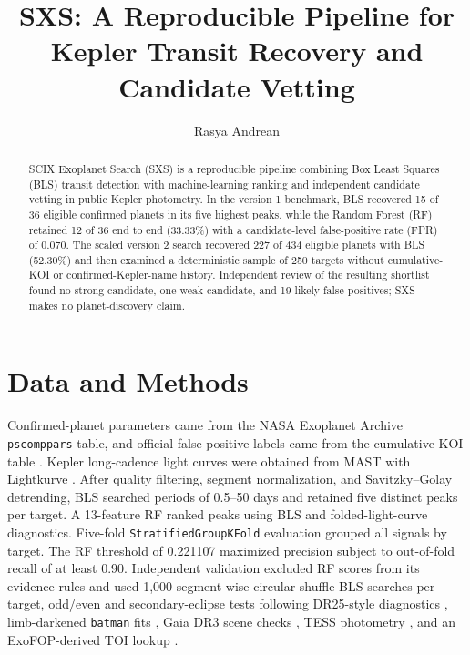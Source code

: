 \documentclass[RNAAS]{aastex7}
\begin{document}
\title{SXS: A Reproducible Pipeline for Kepler Transit Recovery and Candidate Vetting}
\author{Rasya Andrean}

\begin{abstract}
SCIX Exoplanet Search (SXS) is a reproducible pipeline combining Box Least
Squares (BLS) transit detection with machine-learning ranking and independent
candidate vetting in public Kepler photometry. In the version 1 benchmark, BLS
recovered 15 of 36 eligible confirmed planets in its five highest peaks, while
the Random Forest (RF) retained 12 of 36 end to end (33.33\%) with a
candidate-level false-positive rate (FPR) of 0.070. The scaled version 2 search
recovered 227 of 434 eligible planets with BLS (52.30\%) and then examined a
deterministic sample of 250 targets without cumulative-KOI or
confirmed-Kepler-name history. Independent review of the resulting shortlist
found no strong candidate, one weak candidate, and 19 likely false positives;
SXS makes no planet-discovery claim.
\end{abstract}


\section{Data and Methods}
Confirmed-planet parameters came from the NASA Exoplanet Archive
\texttt{pscomppars} table, and official false-positive labels came from the
cumulative KOI table \citep{nasaarchive}. Kepler long-cadence light curves were obtained from MAST
with Lightkurve \citep{lightkurve2018}. After quality filtering, segment
normalization, and Savitzky--Golay detrending, BLS searched periods of
0.5--50 days and retained five distinct peaks per target. A 13-feature RF
ranked peaks using BLS and folded-light-curve diagnostics. Five-fold
\texttt{StratifiedGroupKFold} evaluation grouped all signals by target. The RF
threshold of 0.221107 maximized precision subject to out-of-fold recall of at
least 0.90. Independent validation excluded RF scores from its evidence rules
and used 1,000 segment-wise circular-shuffle BLS searches per target, odd/even
and secondary-eclipse tests following DR25-style diagnostics
\citep{thompson2018}, limb-darkened \texttt{batman} fits
\citep{kreidberg2015}, Gaia DR3 scene checks \citep{gaiaarchive}, TESS
photometry \citep{tessarchive}, and an ExoFOP-derived TOI lookup
\citep{toidocs}.
\end{document}
